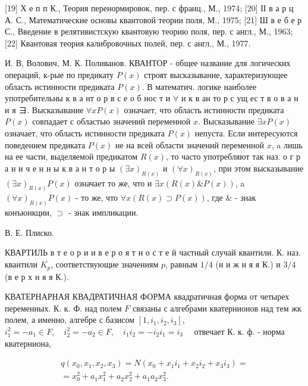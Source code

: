 \documentclass[10pt]{article}
\begin{document}
[19] Х е п п К., Теория перенормировок, пер. с франц., М., 1974; [20] ІІ в а р ц А. С., Математические основы квантовой теории поля, М., 1975; [21] Ш в е б е р С., Введение в релятивистскую квантовую теорию поля, пер. с англ., М., 1963; [22] Квантовая теория калибровочных полей, пер. с англ., М., 1977.



И. В, Волович, М. К. Поливанов. КВАНТОР - общее название для логических операций, к-рые по предикату $P(x)$ строят высказывание, характеризующее область истинности предиката $P(x)$. В математич. логике наиболее употребительны к в а нт о р в с е о б нос т и $\forall$ и к в ан то р с ущ ес т в о в а н и я $ヨ$. Высказывание $\forall x P(x)$ означает, что область истинности предиката $P(x)$ совпадает с областью значений переменной $x$. Высказывание $\exists x P(x)$ означает, что область истинности предиката $P(x)$ непуста. Если интересуются поведением предиката $P(x)$ не на всей области значений переменной $x$, a лишь на ее части, выделяемой предикатом $R(x)$, то часто употребляют так наз. о г р а н и ч е н н ы к в а н т о р ы $(\exists x)_{R(x)}$ и $(\forall x)_{R(x)}$, при этом высказывание $(\exists x)_{R(x)} P(x)$ означает то же, что и $\exists x(R(x) \& P(x))$, a $(\forall x)_{R(x)} P(x)$ - то же, что $\forall x(R(x) \supset P(x))$, где \& - знак конъюнкции, $\supset$ - знак импликации.



В. Е. Плиско.



КВАРТИЛЬ в т е о р и и в е р о я т н о с т е й частный случай квантили. К. наз. квантили $K_{p}$, соответствующие значениям $p$, равным $1 / 4$ (н и ж н я я К.) и $3 / 4$ (в е р х н я я К.).



КВАТЕРНАРНАЯ КВАДРАТИЧНАЯ ФОРМА квадратичная форма от четырех переменных. К. к. Ф. над полем $F$ связаны с алгебрами кватернионов над тем жк полем, а именно, алгебре с базисом $\left[1, i_{1}, i_{2}, i_{3}\right]$, $i_{1}^{2}=-a_{1} \in F, \quad i_{2}^{2}=-a_{2} \in F, \quad i_{1} i_{2}=-i_{2} i_{1}=i_{3} \quad$ отвечает К. к. ф. - норма кватерниона,



\[

\begin{gathered}

q\left(x_{0}, x_{1}, x_{2}, x_{3}\right)=N\left(x_{0}+x_{1} i_{1}+x_{2} i_{2}+x_{3} i_{3}\right)= \\

=x_{0}^{2}+a_{1} x_{1}^{2}+a_{2} x_{2}^{2}+a_{1} a_{2} x_{3}^{2} .

\end{gathered}

\]
\end{document}
